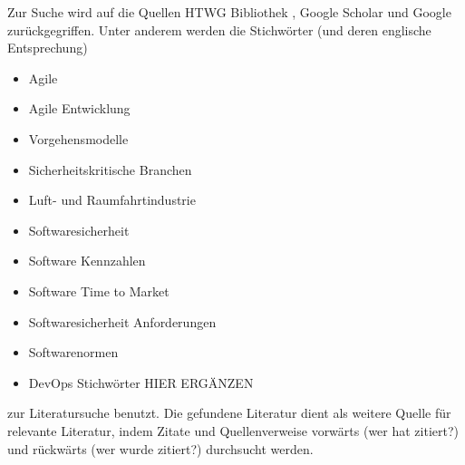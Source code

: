 Zur Suche wird auf die Quellen HTWG Bibliothek \parencite[][]{HTWG2015aa}, Google Scholar \parencite[][]{Google2015aa} und Google \parencite[][]{Google2015ab} zurückgegriffen.
Unter anderem werden die Stichwörter (und deren englische Entsprechung)
\begin{itemize}
\item Agile
\item Agile Entwicklung
\item Vorgehensmodelle
\item Sicherheitskritische Branchen
\item Luft- und Raumfahrtindustrie
\item Softwaresicherheit
\item Software Kennzahlen
\item Software Time to Market
\item Softwaresicherheit Anforderungen
\item Softwarenormen
\item DevOps Stichwörter HIER ERGÄNZEN
\end{itemize}
zur Literatursuche benutzt.
Die gefundene Literatur dient als weitere Quelle für relevante Literatur, indem Zitate und Quellenverweise vorwärts (wer hat zitiert?) und rückwärts (wer wurde zitiert?) durchsucht werden.
